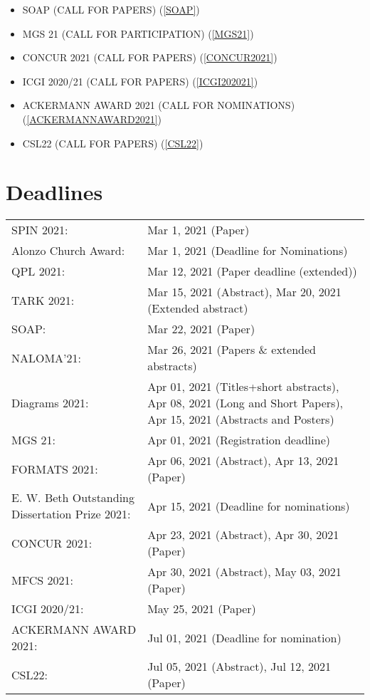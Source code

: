 \documentclass{article}
\begin{document}
\begin{itemize}
\begin{itemize}\item SOAP (CALL FOR PAPERS) (\cref{SOAP})
\item MGS 21 (CALL FOR PARTICIPATION) (\cref{MGS21})
\item CONCUR 2021 (CALL FOR PAPERS) (\cref{CONCUR2021})
\item ICGI 2020/21 (CALL FOR PAPERS) (\cref{ICGI202021})
\item ACKERMANN AWARD 2021 (CALL FOR NOMINATIONS) (\cref{ACKERMANNAWARD2021})
\item CSL22 (CALL FOR PAPERS) (\cref{CSL22})
\end{itemize} 
\end{itemize}\section{Deadlines}\label{deadlines}\begin{tabulary}{\linewidth}{LL}SPIN 2021:  & Mar 1, 2021 (Paper) \\
Alonzo Church Award:  & Mar 1, 2021 (Deadline for Nominations) \\
QPL 2021:  & Mar 12, 2021 (Paper deadline (extended)) \\
TARK 2021:  & Mar 15, 2021 (Abstract), Mar 20, 2021 (Extended abstract) \\
SOAP:  & Mar 22, 2021 (Paper) \\
NALOMA'21:  & Mar 26, 2021 (Papers \& extended abstracts) \\
Diagrams 2021:  & Apr 01, 2021 (Titles+short abstracts), Apr 08, 2021 (Long and Short Papers), Apr 15, 2021 (Abstracts and Posters) \\
MGS 21:  & Apr 01, 2021 (Registration deadline) \\
FORMATS 2021:  & Apr 06, 2021 (Abstract), Apr 13, 2021 (Paper) \\
E. W. Beth Outstanding Dissertation Prize 2021:  & Apr 15, 2021 (Deadline for nominations) \\
CONCUR 2021:  & Apr 23, 2021 (Abstract), Apr 30, 2021 (Paper) \\
MFCS 2021:  & Apr 30, 2021 (Abstract), May 03, 2021 (Paper) \\
ICGI 2020/21:  & May 25, 2021 (Paper) \\
ACKERMANN AWARD 2021:  & Jul 01, 2021 (Deadline for nomination) \\
CSL22:  & Jul 05, 2021 (Abstract), Jul 12, 2021 (Paper) \\
\end{tabulary}
\end{document}
